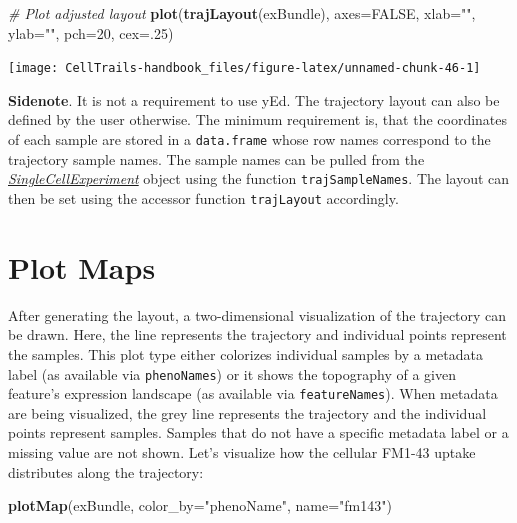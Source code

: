 \documentclass[]{book}
\newenvironment{Shaded}{\begin{snugshade}}{\end{snugshade}}
\newcommand{\KeywordTok}[1]{\textcolor[rgb]{0.13,0.29,0.53}{\textbf{#1}}}
\newcommand{\DataTypeTok}[1]{\textcolor[rgb]{0.13,0.29,0.53}{#1}}
\newcommand{\DecValTok}[1]{\textcolor[rgb]{0.00,0.00,0.81}{#1}}
\newcommand{\StringTok}[1]{\textcolor[rgb]{0.31,0.60,0.02}{#1}}
\newcommand{\CommentTok}[1]{\textcolor[rgb]{0.56,0.35,0.01}{\textit{#1}}}
\newcommand{\OtherTok}[1]{\textcolor[rgb]{0.56,0.35,0.01}{#1}}
\newcommand{\NormalTok}[1]{#1}
\theoremstyle{definition}
\theoremstyle{definition}
\theoremstyle{definition}
\theoremstyle{remark}
\begin{document}
\begin{Shaded}
\begin{Highlighting}[]
\CommentTok{# Plot adjusted layout}
\KeywordTok{plot}\NormalTok{(}\KeywordTok{trajLayout}\NormalTok{(exBundle), }\DataTypeTok{axes=}\OtherTok{FALSE}\NormalTok{, }\DataTypeTok{xlab=}\StringTok{""}\NormalTok{, }\DataTypeTok{ylab=}\StringTok{""}\NormalTok{, }\DataTypeTok{pch=}\DecValTok{20}\NormalTok{, }\DataTypeTok{cex=}\NormalTok{.}\DecValTok{25}\NormalTok{)}
\end{Highlighting}
\end{Shaded}

\texttt{[image: CellTrails-handbook\_files/figure-latex/unnamed-chunk-46-1]}

\textbf{Sidenote}. It is not a requirement to use yEd. The trajectory
layout can also be defined by the user otherwise. The minimum
requirement is, that the coordinates of each sample are stored in a
\texttt{data.frame} whose row names correspond to the trajectory sample
names. The sample names can be pulled from the
\emph{\href{http://bioconductor.org/packages/SingleCellExperiment}{SingleCellExperiment}}
object using the function \texttt{trajSampleNames}. The layout can then
be set using the accessor function \texttt{trajLayout} accordingly.

\section{Plot Maps}\label{plot-maps}

After generating the layout, a two-dimensional visualization of the
trajectory can be drawn. Here, the line represents the trajectory and
individual points represent the samples. This plot type either colorizes
individual samples by a metadata label (as available via
\texttt{phenoNames}) or it shows the topography of a given feature's
expression landscape (as available via \texttt{featureNames}). When
metadata are being visualized, the grey line represents the trajectory
and the individual points represent samples. Samples that do not have a
specific metadata label or a missing value are not shown. Let's
visualize how the cellular FM1-43 uptake distributes along the
trajectory:

\begin{Shaded}
\begin{Highlighting}[]
\KeywordTok{plotMap}\NormalTok{(exBundle, }\DataTypeTok{color_by=}\StringTok{"phenoName"}\NormalTok{, }\DataTypeTok{name=}\StringTok{"fm143"}\NormalTok{)}
\end{Highlighting}
\end{Shaded}
\end{document}
